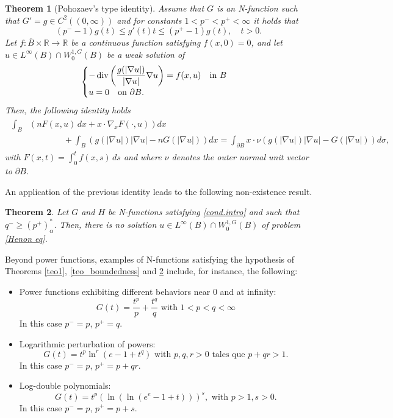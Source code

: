 \documentclass[leqno,twoside, 12pt]{amsart}
\theoremstyle{plain}
\numberwithin{equation}{section} \numberwithin{figure}{section}
\newtheorem{theorem}{Theorem}[section]
\theoremstyle{definition}
\numberwithin{equation}{section}
\def\diver{\mathop{\text{\normalfont div}}}
\begin{document}
\begin{theorem}[Pohozaev's type identity] \label{Poho} Assume that $G$ is an N-function such that $G'=g\in C^{2}((0, \infty))$ and for constants $1<p^-<p^+<\infty$ it holds that
$$
(p^{-}-1)g(t) \leq g'(t)t \leq (p^+-1)g(t), \quad t>0.
$$
Let $f: \overline{B}\times \mathbb{R}\to \mathbb{R}$ be a continuous function satisfying $f(x, 0)=0$, and let $u\in L^{\infty}(B)\cap W_0^{1, G}(B)$ be a weak solution of
\begin{equation*}
\begin{cases}
-\diver\left(\dfrac{g(|\nabla u|)}{|\nabla u|} \nabla u\right)= f(x, u) \quad \text{in }B\\
u=0 \quad \text{on }\partial B.
\end{cases}
\end{equation*}
Then, the following identity holds
\begin{align}\label{Pohozaev indentity}
\begin{split}
\int_B &\left(nF(x, u)\,dx + x\cdot \nabla_x F(\cdot, u)\right)dx \\
&\qquad \qquad +\int_B \left(g(|\nabla u|)|\nabla u| - nG(|\nabla u|)\right)dx= \int_{\partial B} x\cdot \nu \left( g(|\nabla u|)|\nabla u| - G(|\nabla u|)\right) d\sigma,
\end{split}
\end{align}
with  $F(x, t)=\int_0^t f(x, s)\,ds$ and where   $\nu$ denotes the outer normal unit vector to $\partial B$.  
\end{theorem}

An application of the previous identity leads to the following non-existence result.

\begin{theorem}\label{nonexistence result} Let $G$ and $H$ be N-functions satisfying \eqref{cond.intro} and such that $q^-\geq(p^+)_\alpha^*$. Then, there is no solution $u\in L^{\infty}(B)\cap W^{1, G}_0(B)$ of problem \eqref{Henon eq}.
\end{theorem}


Beyond power functions, examples of N-functions satisfying the hypothesis of Theorems \ref{teo1}, \ref{teo_boundedness} and \ref{nonexistence result} include, for instance, the following:
\begin{itemize}
\item[(i)] Power functions exhibiting different behaviors near 0 and at infinity:
 $$G(t)=\frac{t^p}{p} + \frac{t^q}{q} \text{ with }  1<p<q<\infty
$$
In this case $p^-=p$, $p^+=q$.

\item[(ii)] Logarithmic perturbation of powers:
$$
G(t)=t^p \ln^r(e-1+t^q)\text{ with }p,q,r> 0 \text{ tales que } p+qr>1 . 
$$
In this case $p^- = p$, $p^+=p+qr$.

\item[(iii)] Log-double polynomials:
$$
G(t)=t^p (\ln (\ln (e^e-1 +t)))^s, \text{ with } p>1, s>0.
$$
In this case $p^-=p$, $p^+ = p+s$.
\end{itemize}
\end{document}
